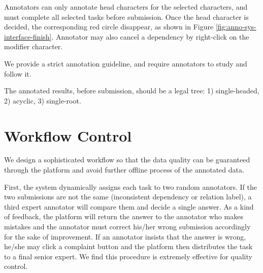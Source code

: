\documentclass[a4paper]{article}
\begin{document}
Annotators can only annotate head characters for the selected characters, and must complete all selected tasks before submission. Once the head character is decided, the corresponding red circle disappear, as shown in Figure \ref{fig:anno-sys-interface-finish}.
Annotator may also cancel a dependency by right-click on the modifier character.

We provide a strict annotation guideline, and require annotators to study and follow it. 

The annotated results, before submission, should be a legal tree: 1) single-headed, 2) acyclic, 3) single-root. 


\section{Workflow Control}


We design a sophisticated workflow so that the data quality can be guaranteed through the platform and avoid further offline process of the annotated data.


First, the system dynamically assigns each task to two random annotators. 
If the two submissions are not the same (inconsistent dependency or relation label), a third expert annotator will compare them and decide a single answer. %
As a kind of feedback, the platform will return the answer to the annotator who makes mistakes and 
the annotator must correct his/her wrong submission accordingly for the sake of improvement. %
If an annotator insists that the answer is wrong, he/she may click a complaint button %
and the platform then distributes the task to a final senior expert. 
We find this procedure is extremely effective for quality control. 
\end{document}
